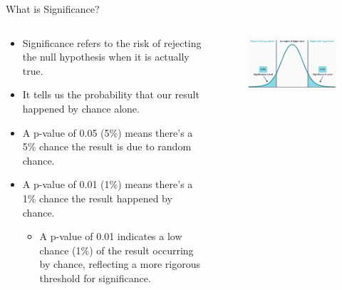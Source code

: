 \documentclass[
  ignorenonframetext,
]{beamer}
\providecommand{\tightlist}{%
  \setlength{\itemsep}{0pt}\setlength{\parskip}{0pt}}
\begin{document}
\begin{frame}{What is Significance?}
\label{what-is-significance-1}
\begin{columns}[T]
\begin{column}{0.5\textwidth}
\begin{itemize}
\tightlist
\item
  Significance refers to the risk of rejecting the null hypothesis when
  it is actually true.
\end{itemize}

\begin{itemize}
\tightlist
\item
  It tells us the probability that our result happened by chance alone.
\end{itemize}

\begin{itemize}
\tightlist
\item
  A p-value of 0.05 (5\%) means there's a 5\% chance the result is due
  to random chance.
\end{itemize}

\begin{itemize}
\tightlist
\item
  A p-value of 0.01 (1\%) means there's a 1\% chance the result happened
  by chance. \tiny

  \begin{itemize}
  \tightlist
  \item
    A p-value of 0.01 indicates a low chance (1\%) of the result
    occurring by chance, reflecting a more rigorous threshold for
    significance.\\
  \end{itemize}
\end{itemize}
\end{column}

\begin{column}{0.5\textwidth}
\vspace{1.5cm}
\begin{figure}

{\centering \includegraphics[width=0.7\linewidth]{figs/significance} 

}

\end{figure}
\end{column}
\end{columns}
\end{frame}
\end{document}
